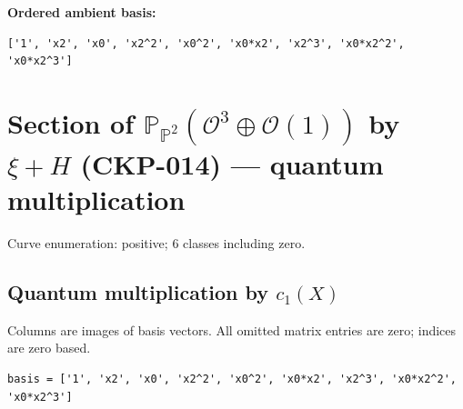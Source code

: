 \documentclass[10pt,a4paper]{article}
\begin{document}
\textbf{Ordered ambient basis:}
\begin{lstlisting}
['1', 'x2', 'x0', 'x2^2', 'x0^2', 'x0*x2', 'x2^3', 'x0*x2^2', 'x0*x2^3']
\end{lstlisting}

\clearpage\section*{Section of $\mathbb P_{\mathbb P^{2}}(\mathcal O^{3}\oplus \mathcal O(1))$ by $\xi +H$ (CKP-014) --- quantum multiplication}

Curve enumeration: positive; 6 classes including zero.
\subsection*{Quantum multiplication by $c_1(X)$}
Columns are images of basis vectors. All omitted matrix entries are zero; indices are zero based.

\begin{lstlisting}
basis = ['1', 'x2', 'x0', 'x2^2', 'x0^2', 'x0*x2', 'x2^3', 'x0*x2^2', 'x0*x2^3']
\end{lstlisting}
\end{document}
